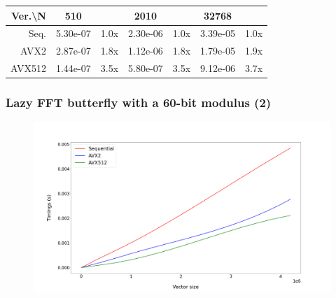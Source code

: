 \documentclass[10pt]{beamer}
\begin{document}
\begin{frame}
\begin{table}[h!]
\begin{tabular}{|r|*{3}{c c|}}
            \hline
            \rowcolor{myGray}
            Ver.\textbackslash N & 510 & & 2010 & & 32768 & \\
            \hline
            \cellcolor{myGray} Seq. & 5.30e-07 & 1.0x & 2.30e-06 & 1.0x & 3.39e-05 & 1.0x \\
            \hline
            \cellcolor{myGray} AVX2 & 2.87e-07 & 1.8x & 1.12e-06 & 1.8x & 1.79e-05 & 1.9x \\
            \hline
            \cellcolor{myGray} AVX512 & 1.44e-07 & 3.5x & 5.80e-07 & 3.5x & 9.12e-06 & 3.7x \\
            \hline
        \end{tabular}
    \end{table}
\end{frame}

\begin{frame}
    \frametitle{Lazy FFT butterfly with a 60-bit modulus (2)}

    \begin{figure}[h!]
        \begin{center}
            \includegraphics[width=1\textwidth]{lazy-butterfly_argiope.png}
        \end{center}
    \end{figure}
\end{frame}
\end{document}
